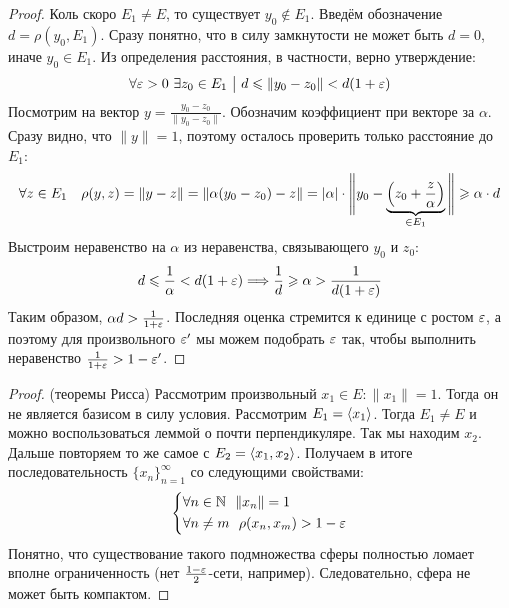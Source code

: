 \begin{proof}
	Коль скоро $E_1 \neq E$, то существует $y_0 \notin E_1$. Введём обозначение $d = \rho(y_0, E_1)$. Сразу понятно, что в силу замкнутости не может быть $d = 0$, иначе $y_0 \in E_1$. Из определения расстояния, в частности, верно утверждение:
	\[
		\forall \varepsilon > 0\ \exists z_0 \in E_1 \ \big|\  d \leqslant \|y_0 - z_0\| < d(1 + \varepsilon)
	\]
	Посмотрим на вектор $y = \frac{y_0 - z_0}{\|y_0 - z_0\|}$. Обозначим коэффициент при векторе за $\alpha$. Сразу видно, что $\|y\| = 1$, поэтому осталось проверить только расстояние до $E_1$:
	\[
		\forall z \in E_1\quad \rho(y, z) = \|y - z\| = \|\alpha(y_0 - z_0) - z\| = |\alpha| \cdot \Bigg\|y_0 - \underbrace{\left(z_0 + \frac{z}{\alpha}\right)}_{\in E_1}\Bigg\| \geqslant \alpha \cdot d
	\]
	Выстроим неравенство на $\alpha$ из неравенства, связывающего $y_0$ и $z_0$:
	\[
		d \leqslant \frac{1}{\alpha} < d(1 + \varepsilon) \Longrightarrow \frac{1}{d} \geqslant \alpha > \frac{1}{d(1 + \varepsilon)}
	\]
	Таким образом, $\alpha d > \frac{1}{1 + \varepsilon}$. Последняя оценка стремится к единице с ростом $\varepsilon$, а поэтому для произвольного $\varepsilon'$ мы можем подобрать $\varepsilon$ так, чтобы выполнить неравенство $\frac{1}{1 + \varepsilon} > 1 - \varepsilon'$.
\end{proof}

\begin{proof} (теоремы Рисса)
	Рассмотрим произвольный $x_1 \in E\colon \|x_1\| = 1$. Тогда он не является базисом в силу условия. Рассмотрим $E_1 = \left\langle x_1\right\rangle$. Тогда $E_1 \neq E$ и можно воспользоваться леммой о почти перпендикуляре. Так мы находим $x_2$. Дальше повторяем то же самое с $E_2 = \left\langle x_1, x_2\right\rangle$. Получаем в итоге последовательность $\{x_n\}_{n = 1}^\infty$ со следующими свойствами:
	\[
		\left\{ \begin{aligned} 
			&{\forall n \in \mathbb{N}\ \ \|x_n\| = 1}
			\\
			&{\forall n \neq m\ \ \rho(x_n, x_m) > 1 - \varepsilon}
		 \end{aligned} \right.
	\]
	Понятно, что существование такого подмножества сферы полностью ломает вполне ограниченность (нет $\frac{1 - \varepsilon}{2}$-сети, например). Следовательно, сфера не может быть компактом.
\end{proof}
